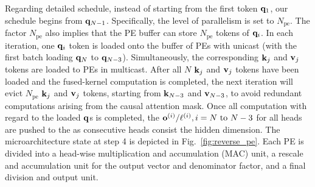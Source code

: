 \documentclass[sigconf]{acmart}
\begin{document}

Regarding detailed schedule, instead of starting from the first token \( {\bf q}_1 \), our schedule begins from \( {\bf q}_{N-1} \). Specifically, the level of parallelism is set to \( N_{\text{pe}} \). The factor \( N_{\text{pe}} \) also implies that the PE buffer can store \( N_{\text{pe}} \) tokens of \( {\bf q}_i \). In each iteration, one \( {\bf q}_i \) token is loaded onto the buffer of PEs with unicast (with the first batch loading \( {\bf q}_N \) to \( {\bf q}_{N-3} \)). Simultaneously, the corresponding \( {\bf k}_j \) and \( {\bf v}_j \) tokens are loaded to PEs in multicast. After all \( N \) \( {\bf k}_j \) and \( {\bf v}_j \) tokens have been loaded and the fused-kernel computation is completed, the next iteration will evict \( N_{\text{pe}} \) \( {\bf k}_j \) and \( {\bf v}_j \) tokens, starting from \( {\bf k}_{N-3} \) and \( {\bf v}_{N-3} \), to avoid redundant computations arising from the causal attention mask. Once all computation with regard to the loaded $\bf q$s is completed, the  ${\bf o}^{(i)}/\ell^{(i)}, i = N \text{ to } N-3$ for all heads are pushed to the as consecutive heads consist the hidden dimension. The microarchitecture state at step 4 is depicted in Fig.~\ref{fig:reverse_pe}. Each PE is divided into a head-wise multiplication and accumulation (MAC) unit, a rescale and accumulation unit for the output vector and denominator factor, and a final division and output unit.
\end{document}
